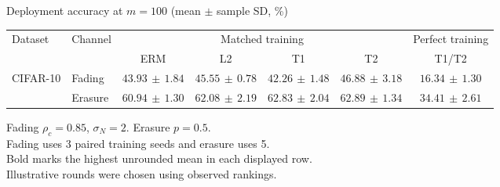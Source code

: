\documentclass[border=4pt]{standalone}
\begin{document}
\begin{minipage}{7.8in}
\centering
Deployment accuracy at $m=100$ (mean $\pm$ sample SD, \%)\\[4pt]
\begin{tabular*}{\linewidth}{@{\extracolsep{\fill}}llccccc@{}}
\toprule
\multirow{2}{*}{Dataset} & \multirow{2}{*}{Channel} & \multicolumn{4}{c}{Matched training} & Perfect training \\
\cmidrule(lr){3-6}\cmidrule(l){7-7}
 & & ERM & L2 & T1 & T2 & T1/T2 \\
\midrule
\multirow{2}{*}{CIFAR-10} & Fading & $43.93\,\pm\,1.84$ & $45.55\,\pm\,0.78$ & $42.26\,\pm\,1.48$ & $\mathbf{46.88}\,\pm\,3.18$ & $16.34\,\pm\,1.30$ \\
 & Erasure & $60.94\,\pm\,1.30$ & $62.08\,\pm\,2.19$ & $62.83\,\pm\,2.04$ & $\mathbf{62.89}\,\pm\,1.34$ & $34.41\,\pm\,2.61$ \\
\bottomrule
\end{tabular*}
\par\smallskip\raggedright\footnotesize
Fading $\rho_c=0.85$, $\sigma_N=2$. Erasure $p=0.5$.\\
Fading uses 3 paired training seeds and erasure uses 5.\\
Bold marks the highest unrounded mean in each displayed row.\\
Illustrative rounds were chosen using observed rankings.
\end{minipage}
\end{document}
